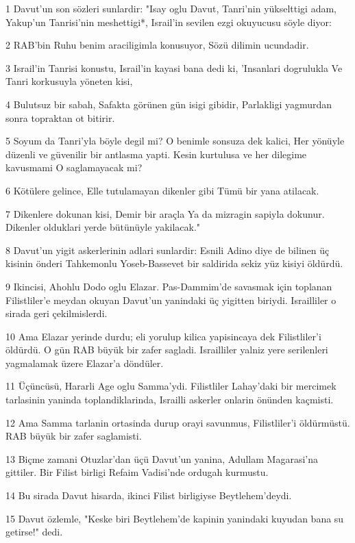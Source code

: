 \par 1 Davut'un son sözleri sunlardir: "Isay oglu Davut, Tanri'nin yükselttigi adam, Yakup'un Tanrisi'nin meshettigi*, Israil'in sevilen ezgi okuyucusu söyle diyor:
\par 2 RAB'bin Ruhu benim araciligimla konusuyor, Sözü dilimin ucundadir.
\par 3 Israil'in Tanrisi konustu, Israil'in kayasi bana dedi ki, 'Insanlari dogrulukla Ve Tanri korkusuyla yöneten kisi,
\par 4 Bulutsuz bir sabah, Safakta görünen gün isigi gibidir, Parlakligi yagmurdan sonra topraktan ot bitirir.
\par 5 Soyum da Tanri'yla böyle degil mi? O benimle sonsuza dek kalici, Her yönüyle düzenli ve güvenilir bir antlasma yapti. Kesin kurtulusa ve her dilegime kavusmami O saglamayacak mi?
\par 6 Kötülere gelince, Elle tutulamayan dikenler gibi Tümü bir yana atilacak.
\par 7 Dikenlere dokunan kisi, Demir bir araçla Ya da mizragin sapiyla dokunur. Dikenler olduklari yerde bütünüyle yakilacak."
\par 8 Davut'un yigit askerlerinin adlari sunlardir: Esnili Adino diye de bilinen üç kisinin önderi Tahkemonlu Yoseb-Bassevet bir saldirida sekiz yüz kisiyi öldürdü.
\par 9 Ikincisi, Ahohlu Dodo oglu Elazar. Pas-Dammim'de savasmak için toplanan Filistliler'e meydan okuyan Davut'un yanindaki üç yigitten biriydi. Israilliler o sirada geri çekilmislerdi.
\par 10 Ama Elazar yerinde durdu; eli yorulup kilica yapisincaya dek Filistliler'i öldürdü. O gün RAB büyük bir zafer sagladi. Israilliler yalniz yere serilenleri yagmalamak üzere Elazar'a döndüler.
\par 11 Üçüncüsü, Hararli Age oglu Samma'ydi. Filistliler Lahay'daki bir mercimek tarlasinin yaninda toplandiklarinda, Israilli askerler onlarin önünden kaçmisti.
\par 12 Ama Samma tarlanin ortasinda durup orayi savunmus, Filistliler'i öldürmüstü. RAB büyük bir zafer saglamisti.
\par 13 Biçme zamani Otuzlar'dan üçü Davut'un yanina, Adullam Magarasi'na gittiler. Bir Filist birligi Refaim Vadisi'nde ordugah kurmustu.
\par 14 Bu sirada Davut hisarda, ikinci Filist birligiyse Beytlehem'deydi.
\par 15 Davut özlemle, "Keske biri Beytlehem'de kapinin yanindaki kuyudan bana su getirse!" dedi.

